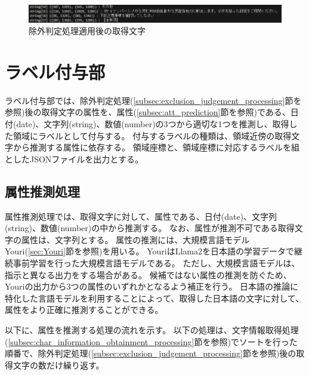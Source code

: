 \begin{figure}[t]
    \begin{center}
        \includegraphics[width=15cm]{image/04-implementation/after_exclusion_string.png}
        \caption{除外判定処理適用後の取得文字}
        \label{fig:after_exclusion_string}
    \end{center}
\end{figure}

\section{ラベル付与部}\label{sec:label_link_part}
ラベル付与部では、除外判定処理(\ref{subsec:exclusion_judgement_processing}節を参照)後の取得文字の属性を、属性(\ref{subsec:att_prediction}節を参照)である、日付(date)、文字列(string)、数値(number)の3つから適切な1つを推測し、取得した領域にラベルとして付与する。
付与するラベルの種類は、領域近傍の取得文字から推測する属性に依存する。
領域座標と、領域座標に対応するラベルを組としたJSONファイルを出力とする。

\subsection{属性推測処理}\label{subsec:att_prediction_processing}
属性推測処理では、取得文字に対して、属性である、日付(date)、文字列(string)、数値(number)の中から推測する。
なお、属性が推測不可である取得文字の属性は、文字列とする。
属性の推測には、大規模言語モデルYouri(\ref{sec:Youri}節を参照)を用いる。
YouriはLlama2を日本語の学習データで継続事前学習を行った大規模言語モデルである。
ただし、大規模言語モデルは、指示と異なる出力をする場合がある。
候補ではない属性の推測を防ぐため、Youriの出力から3つの属性のいずれかとなるよう補正を行う。
日本語の推論に特化した言語モデルを利用することによって、取得した日本語の文字に対して、属性をより正確に推測することができる。

以下に、属性を推測する処理の流れを示す。
以下の処理は、文字情報取得処理(\ref{subsec:char_information_obtainment_processing}節を参照)でソートを行った順番で、除外判定処理(\ref{subsec:exclusion_judgement_processing}節を参照)後の取得文字の数だけ繰り返す。

